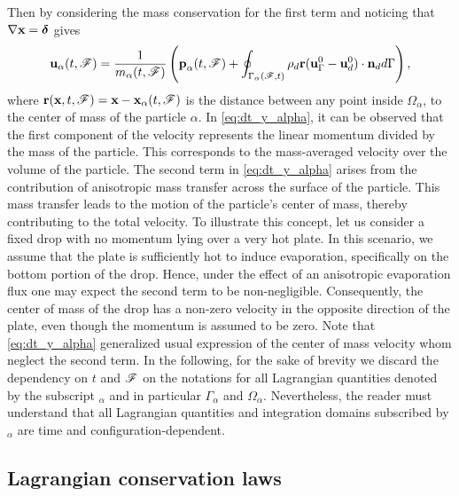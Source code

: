 \documentclass[11pt]{My_preprint}
\providecommand{\DIFaddbegin}{} %
\providecommand{\DIFaddend}{} %
\providecommand{\DIFdelbegin}{} %
\providecommand{\DIFdelend}{} %
\begin{document}
Then by considering the mass conservation for the first term and noticing that $\mathbf{\nabla} \textbf{x} = \bm\delta$ gives\begin{equation}
    \textbf{u}_\alpha(t,\FF) = \frac{1}{m_\alpha(t,\FF)} \left(
        \textbf{p}_\alpha(t,\FF)
        +  \DIFdelbegin %
\DIFdelend \DIFaddbegin \intSF{\rho_d \textbf{r} (\textbf{u}_\Gamma^0 - \textbf{u}_d^0)\cdot \textbf{n}_d }
        \DIFaddend \right),
        \label{eq:dt_y_alpha}
\end{equation}
where $\textbf{r}(\textbf{x},t,\mathscr{F}) = \textbf{x} - \textbf{x}_\alpha(t,\mathscr{F})$ is the distance between any point inside $\Omega_\alpha$, to the center of mass of the particle $\alpha$.
In \ref{eq:dt_y_alpha}, it can be observed that the first component of the velocity represents the linear momentum divided by the mass of the particle. 
This corresponds to the mass-averaged velocity over the volume of the particle.
The second term in \ref{eq:dt_y_alpha} arises from the contribution of anisotropic mass transfer across the surface of the particle. 
This mass transfer leads to the motion of the particle's center of mass, thereby contributing to the total velocity.
To illustrate this concept, let us consider a fixed drop with no momentum lying over a very hot plate.
In this scenario, we assume that the plate is sufficiently hot to induce evaporation, specifically on the bottom portion of the drop.
Hence, under the effect of an anisotropic evaporation flux one may expect the second term to be non-negligible.
Consequently, the center of mass of the drop has a non-zero velocity in the opposite direction of the plate, even though the momentum is assumed to be zero.
Note that \ref{eq:dt_y_alpha} generalized usual expression of the center of mass velocity whom neglect the second term.
In the following, for the sake of brevity we discard the dependency on $t$ and $\mathscr{F}$ on the notations for all Lagrangian quantities denoted by the subscript $_\alpha$ and in particular $\Gamma_\alpha$ and $\Omega_\alpha$.
Nevertheless, the reader must understand that all Lagrangian quantities and integration domains subscribed by $_\alpha$ are time and configuration-dependent. 



\subsection{Lagrangian conservation laws}
\end{document}
